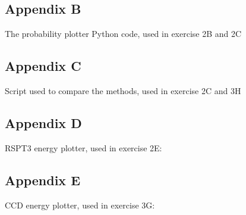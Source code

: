 \documentclass[norsk,a4paper,12pt]{article}
\begin{document}
\subsection*{Appendix B}
The probability plotter Python code, used in exercise 2B and 2C


\newpage
\subsection*{Appendix C}
Script used to compare the methods, used in exercise 2C and 3H


\subsection*{Appendix D}
RSPT3 energy plotter, used in exercise 2E:


\newpage
\subsection*{Appendix E}
CCD energy plotter, used in exercise 3G:

\end{document}
